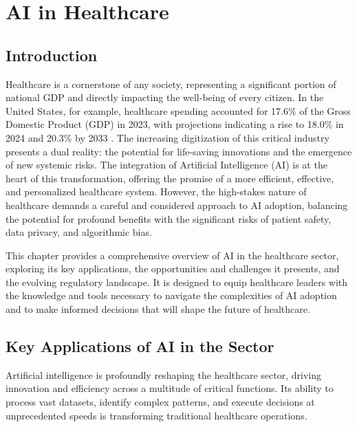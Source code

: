 \chapter{AI in Healthcare}
\label{cha:ai_in_healthcare}

\section{Introduction}

Healthcare is a cornerstone of any society, representing a significant portion of national GDP and directly impacting the well-being of every citizen. In the United States, for example, healthcare spending accounted for 17.6\% of the Gross Domestic Product (GDP) in 2023, with projections indicating a rise to 18.0\% in 2024 and 20.3\% by 2033 \cite{CMS_HealthcareSpending}. The increasing digitization of this critical industry presents a dual reality: the potential for life-saving innovations and the emergence of new systemic risks. The integration of Artificial Intelligence (AI) is at the heart of this transformation, offering the promise of a more efficient, effective, and personalized healthcare system. However, the high-stakes nature of healthcare demands a careful and considered approach to AI adoption, balancing the potential for profound benefits with the significant risks of patient safety, data privacy, and algorithmic bias.

This chapter provides a comprehensive overview of AI in the healthcare sector, exploring its key applications, the opportunities and challenges it presents, and the evolving regulatory landscape. It is designed to equip healthcare leaders with the knowledge and tools necessary to navigate the complexities of AI adoption and to make informed decisions that will shape the future of healthcare.

\section{Key Applications of AI in the Sector}

Artificial intelligence is profoundly reshaping the healthcare sector, driving innovation and efficiency across a multitude of critical functions. Its ability to process vast datasets, identify complex patterns, and execute decisions at unprecedented speeds is transforming traditional healthcare operations.

